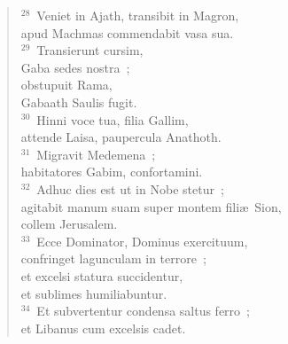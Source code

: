 \begin{flushleft}\begin{verse}${}^{28}$~Veniet in Ajath, transibit in Magron,\\ apud Machmas commendabit vasa sua.\\
${}^{29}$~Transierunt cursim,\\ Gaba sedes nostra~;\\ obstupuit Rama,\\ Gabaath Saulis fugit.\\
${}^{30}$~Hinni voce tua, filia Gallim,\\ attende Laisa, paupercula Anathoth.\\
${}^{31}$~Migravit Medemena~;\\ habitatores Gabim, confortamini.\\
${}^{32}$~Adhuc dies est ut in Nobe stetur~;\\ agitabit manum suam super montem fili\ae\ Sion,\\ collem Jerusalem.\\
${}^{33}$~Ecce Dominator, Dominus exercituum,\\ confringet lagunculam in terrore~;\\ et excelsi statura succidentur,\\ et sublimes humiliabuntur.\\
${}^{34}$~Et subvertentur condensa saltus ferro~;\\ et Libanus cum excelsis cadet.\end{verse}\end{flushleft}


